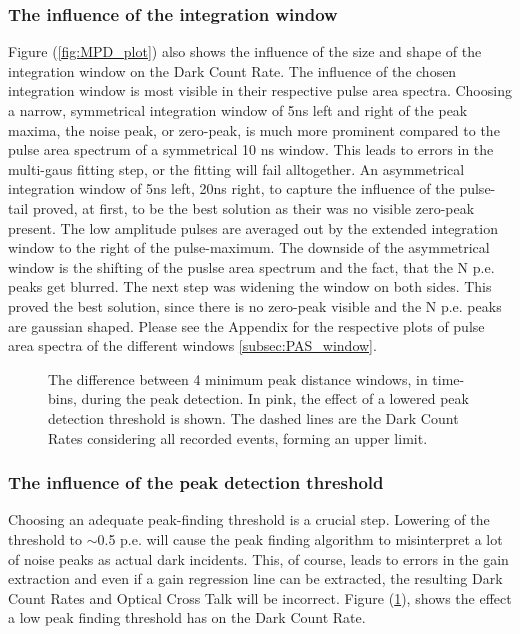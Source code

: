\documentclass[12pt,article,type=msc,colorback,accentcolor=tud9c]{tudthesis}
\begin{document}
\subsubsection{The influence of the integration window}
Figure (\ref{fig:MPD_plot}) also shows the influence of the size and shape of the integration window on the Dark Count Rate. The influence of the chosen integration window is most visible in their respective pulse area spectra. Choosing a narrow, symmetrical integration window of 5ns left and right of the peak maxima, the noise peak, or zero-peak, is much more prominent compared to the pulse area spectrum of a symmetrical 10 ns window. This leads to errors in the multi-gaus fitting step, or the fitting will fail alltogether. An asymmetrical integration window of 5ns left, 20ns right, to capture the influence of the pulse-tail proved, at first, to be the best solution as their was no visible zero-peak present. The low amplitude pulses are averaged out by the extended integration window to the right of the pulse-maximum. The downside of the asymmetrical window is the shifting of the puslse area spectrum and the fact, that the N p.e. peaks get blurred. The next step was widening the window on both sides. This proved the best solution, since there is no zero-peak visible and the N p.e. peaks are gaussian shaped. Please see the Appendix for the respective plots of pulse area spectra of the different windows \ref{subsec:PAS_window}.
\begin{figure}[t]
\begin{centering}
\caption[MPD parameter challenges and the threshold]{The difference between 4 minimum peak distance windows, in time-bins, during the peak detection.  In pink, the effect of a lowered peak detection threshold is shown. The dashed lines are the Dark Count Rates considering all recorded events, forming an upper limit.}
\label{fig:PF_Thresh_plot}
\end{centering}
\end{figure}

\subsubsection{The influence of the peak detection threshold}

Choosing an adequate peak-finding threshold is a crucial step. Lowering of the threshold to $\sim$0.5 p.e. will cause the peak finding algorithm to misinterpret a lot of noise peaks as actual dark incidents. This, of course, leads to errors in the gain extraction and even if a gain regression line can be extracted, the resulting Dark Count Rates and Optical Cross Talk will be incorrect. Figure (\ref{fig:PF_Thresh_plot}), shows the effect a low peak finding threshold has on the Dark Count Rate.
\end{document}
